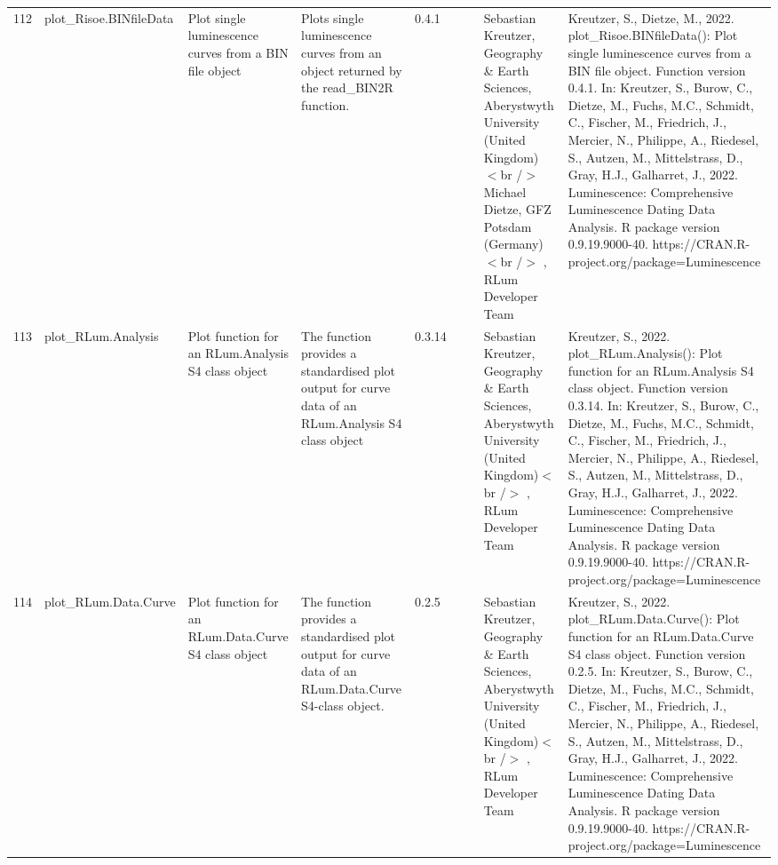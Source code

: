 \begin{table}[ht]
\begin{tabular}{rllllllll}
 \\ 
  112 & plot\_Risoe.BINfileData & Plot single luminescence curves from a BIN file object & Plots single luminescence curves from an object returned by the read\_BIN2R  function. & 0.4.1
 &  &  & Sebastian Kreutzer, Geography \& Earth Sciences, Aberystwyth University (United Kingdom) $<$br /$>$ Michael Dietze, GFZ Potsdam (Germany)$<$br /$>$ , RLum Developer Team & Kreutzer, S., Dietze, M., 2022. plot\_Risoe.BINfileData(): Plot single luminescence curves from a BIN file object. Function version 0.4.1. In: Kreutzer, S., Burow, C., Dietze, M., Fuchs, M.C., Schmidt, C., Fischer, M., Friedrich, J., Mercier, N., Philippe, A., Riedesel, S., Autzen, M., Mittelstrass, D., Gray, H.J., Galharret, J., 2022. Luminescence: Comprehensive Luminescence Dating Data Analysis. R package version 0.9.19.9000-40. https://CRAN.R-project.org/package=Luminescence
 \\ 
  113 & plot\_RLum.Analysis & Plot function for an RLum.Analysis S4 class object & The function provides a standardised plot output for curve data of an RLum.Analysis S4 class object & 0.3.14
 &  &  & Sebastian Kreutzer, Geography \& Earth Sciences, Aberystwyth University (United Kingdom)$<$br /$>$ , RLum Developer Team & Kreutzer, S., 2022. plot\_RLum.Analysis(): Plot function for an RLum.Analysis S4 class object. Function version 0.3.14. In: Kreutzer, S., Burow, C., Dietze, M., Fuchs, M.C., Schmidt, C., Fischer, M., Friedrich, J., Mercier, N., Philippe, A., Riedesel, S., Autzen, M., Mittelstrass, D., Gray, H.J., Galharret, J., 2022. Luminescence: Comprehensive Luminescence Dating Data Analysis. R package version 0.9.19.9000-40. https://CRAN.R-project.org/package=Luminescence
 \\ 
  114 & plot\_RLum.Data.Curve & Plot function for an RLum.Data.Curve S4 class object & The function provides a standardised plot output for curve data of an RLum.Data.Curve  S4-class object. & 0.2.5
 &  &  & Sebastian Kreutzer, Geography \& Earth Sciences, Aberystwyth University (United Kingdom)$<$br /$>$ , RLum Developer Team & Kreutzer, S., 2022. plot\_RLum.Data.Curve(): Plot function for an RLum.Data.Curve S4 class object. Function version 0.2.5. In: Kreutzer, S., Burow, C., Dietze, M., Fuchs, M.C., Schmidt, C., Fischer, M., Friedrich, J., Mercier, N., Philippe, A., Riedesel, S., Autzen, M., Mittelstrass, D., Gray, H.J., Galharret, J., 2022. Luminescence: Comprehensive Luminescence Dating Data Analysis. R package version 0.9.19.9000-40. https://CRAN.R-project.org/package=Luminescence
 \\ 

\end{tabular}
\end{table}
